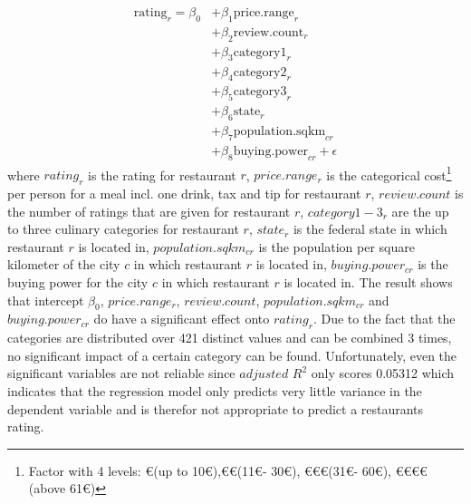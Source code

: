 \begin{equation}
	\begin{aligned}
	\mathrm{rating}_{r} = \beta_{0}
	&+ \beta_{1}  \mathrm{price.range}_{r} \\
	&+ \beta_{2}  \mathrm{review.count}_{r} \\
	&+ \beta_{3}  \mathrm{category1}_{r}    \\
	&+ \beta_{4}  \mathrm{category2}_{r} \\
	&+ \beta_{5}  \mathrm{category3}_{r} \\
	&+ \beta_{6}  \mathrm{state}_{r}   \\
	&+ \beta_{7}  \mathrm{population.sqkm}_{cr}  \\
	&+ \beta_{8}  \mathrm{buying.power}_{cr} + \epsilon
	\end{aligned}
	\label{eq:rating_regression}
\end{equation}
where $rating_r$ is the rating for restaurant $r$, $price.range_r$ is the categorical cost\footnote{Factor with 4 levels: \euro (up to 10\euro),\euro\euro (11\euro - 30\euro), \euro\euro\euro (31\euro - 60\euro), \euro\euro\euro\euro (above 61\euro) } per person for a meal incl. one drink, tax and tip for restaurant $r$, $review.count$ is the number of ratings that are given for restaurant $r$, $category1-3_r$ are the up to three culinary categories for restaurant $r$, $state_r$ is the federal state in which restaurant $r$ is located in, $population.sqkm_{cr}$ is the population per square kilometer of the city $c$ in which restaurant $r$ is located in, $buying.power_{cr}$ is the buying power for the city $c$ in which restaurant $r$ is located in. \newline
The result shows that  intercept $\beta_{0}$, $price.range_r$, $review.count$, $population.sqkm_{cr}$ and
$buying.power_{cr}$ do have a significant effect onto $rating_r$. Due to the fact that the categories are distributed over 421 distinct values and can be combined 3 times, no significant impact of a certain category can be found. Unfortunately, even the significant variables are not reliable since $adjusted$ $ R^2$ only scores 0.05312 which indicates that the regression model only predicts very little variance in the dependent variable and is therefor not appropriate to predict a restaurants rating.


